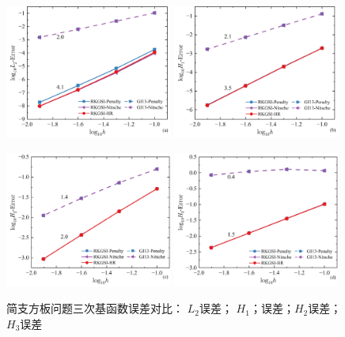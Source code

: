 \begin{figure}[H]
    \centering
    \begin{subcaptiongroup}
    \includegraphics[width=0.49\textwidth]{figure/PHR/R/CL2.png}
    \label{CL2}
    \includegraphics[width=0.49\textwidth]{figure/PHR/R/CH1.png}
    \label{CH1}
    \end{subcaptiongroup}
    \begin{subcaptiongroup}
    \includegraphics[width=0.49\textwidth]{figure/PHR/R/CH2.png}
    \label{CH2}
    \includegraphics[width=0.49\textwidth]{figure/PHR/R/CH3.png}
    \label{CH3}
    \end{subcaptiongroup}
\caption{简支方板问题三次基函数误差对比： $L_2$误差； $H_1$；误差；$H_2$误差； $H_3$误差}
\label{RCLH}
\end{figure}
